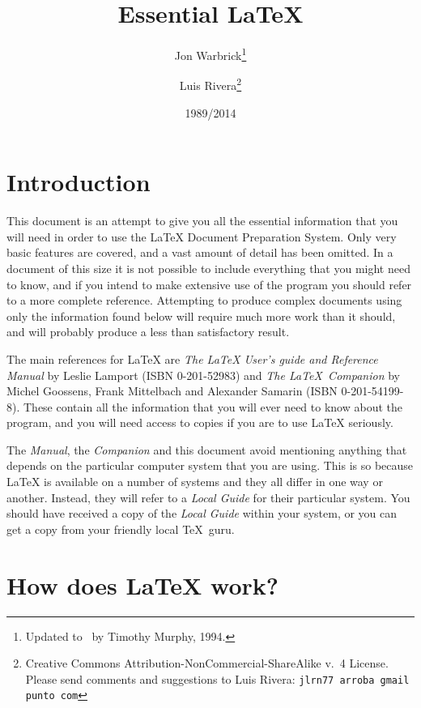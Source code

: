 \documentclass[11pt,a4paper]{article}
\title{Essential \LaTeX}
\author{Jon Warbrick\thanks{Updated to \LaTeXe\ by Timothy Murphy, 1994. 
}
\and Luis Rivera\thanks{
\ccbyncsa{} Creative Commons Attribution-NonCommercial-ShareAlike v.~4 License. Please send comments and suggestions to Luis Rivera: \texttt{jlrn77 arroba gmail punto com}}}
\date{1989/2014}
\begin{document}
\maketitle


\section{Introduction}

This document is an attempt to give you all the essential
information that you will need in order to use the \LaTeX{} Document
Preparation System.  Only very basic features are covered, and a
vast amount of detail has been omitted.  In a document of this size
it is not possible to include everything that you might need to know,
and if you intend to make extensive use of the program you should
refer to a more complete reference.  Attempting to produce complex
documents using only the information found below will require
much more work than it should, and will probably produce a less
than satisfactory result.

The main references for \LaTeX{} are \emph{The \LaTeX{} User's guide and
Reference Manual} by Leslie Lamport (ISBN 0-201-52983)
and \emph{The \LaTeX\ Companion} 
by Michel Goossens, Frank Mittelbach and Alexander Samarin (ISBN 0-201-54199-8).
These contain
all the information that you will ever need to know about the program,
and you will need access to copies if you are to use \LaTeX{}
seriously.

 The \emph{Manual}, the \emph{Companion} and this document avoid mentioning anything that
 depends on the particular computer system that you are using.  
 This is so because \LaTeX{} is available on a number of systems and they all
 differ in one way or another.  
 Instead, they will refer to a \emph{Local
 Guide} for their particular system.  
 You should have received a copy of the \emph{Local Guide} within your system, or you can get a copy from your friendly local \TeX\ guru.

\section{How does \LaTeX{} work?}
\end{document}
